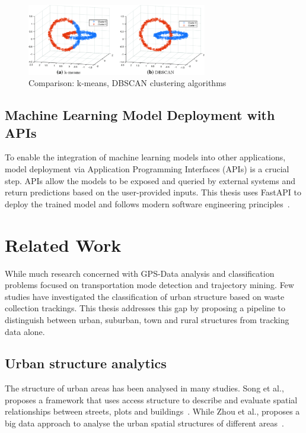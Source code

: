 \documentclass[a4paper,12pt,twoside]{scrreprt}
\begin{document}
\begin{figure}[htbp]
  \centering

  \includegraphics[width=0.7\textwidth]{Figures/background/k-means-and-DBSCAN-clustering-results-on-Chainlink-data-set.png}
  \caption{Comparison: k-means, DBSCAN clustering algorithms
    \cite{liang_graph-based_2024}}
  \label{fig:dbscan_against_k-means}
\end{figure}
\FloatBarrier

\subsection{Machine Learning Model Deployment with APIs}

To enable the integration of machine learning models into other applications,
model deployment via Application Programming Interfaces (APIs) is a crucial
step.
APIs allow the models to be exposed and queried by external systems and return
predictions based on the user-provided inputs.
This thesis uses FastAPI to deploy the trained model and follows modern
software engineering
principles~\cite{voron_building_2023,noauthor_deploying_nodate}.

\section{Related Work}
While much research concerned with GPS-Data analysis and classification
problems
focused on transportation mode detection and trajectory mining. Few studies
have investigated the classification of urban structure
based on waste collection trackings.
This thesis addresses this gap by proposing a pipeline to distinguish between
urban, suburban, town and rural structures from tracking data alone.

\subsection{Urban structure analytics}
The structure of urban areas has been analysed in many studies.
Song et al., proposes a framework that uses access structure to describe and
evaluate spatial relationships between streets, plots and
buildings~\cite{song_access_2021}. While Zhou et al., proposes a big data
approach to
analyse the urban spatial structures of different
areas~\cite{zhou_research_2022}.
\end{document}
